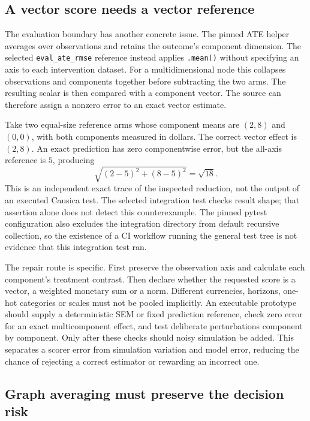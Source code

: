 \subsection{A vector score needs a vector reference}

The evaluation boundary has another concrete issue. The pinned ATE helper
averages over observations and retains the outcome's component dimension.
The selected \texttt{eval\_ate\_rmse} reference instead applies
\texttt{.mean()} without specifying an axis to each intervention dataset.
For a multidimensional node this collapses observations and components
together before subtracting the two arms. The resulting scalar is then
compared with a component vector. The source can therefore assign a nonzero
error to an exact vector estimate. \citep{exec14_causica_primary}

Take two equal-size reference arms whose component means are \((2,8)\) and
\((0,0)\), with both components measured in dollars. The correct vector
effect is \((2,8)\). An exact prediction has zero componentwise error, but
the all-axis reference is \(5\), producing
\[
       \sqrt{(2-5)^2+(8-5)^2}=\sqrt{18}.
\]
This is an independent exact trace of the inspected reduction, not the output
of an executed Causica test. The selected integration test checks result shape;
that assertion alone does not detect this counterexample. The pinned pytest
configuration also excludes the integration directory from default recursive
collection, so the existence of a CI workflow running the general test tree
is not evidence that this integration test ran.
\citep{exec14_causica_primary,exec14_causica_exact}

The repair route is specific. First preserve the observation axis and calculate
each component's treatment contrast. Then declare whether the requested score
is a vector, a weighted monetary sum or a norm. Different currencies, horizons,
one-hot categories or scales must not be pooled implicitly. An executable
prototype should supply a deterministic SEM or fixed prediction reference,
check zero error for an exact multicomponent effect, and test deliberate
perturbations component by component. Only after these checks should noisy
simulation be added. This separates a scorer error from simulation variation
and model error, reducing the chance of rejecting a correct estimator or
rewarding an incorrect one. \citep{exec14_causica_decision}

\subsection{Graph averaging must preserve the decision risk}

